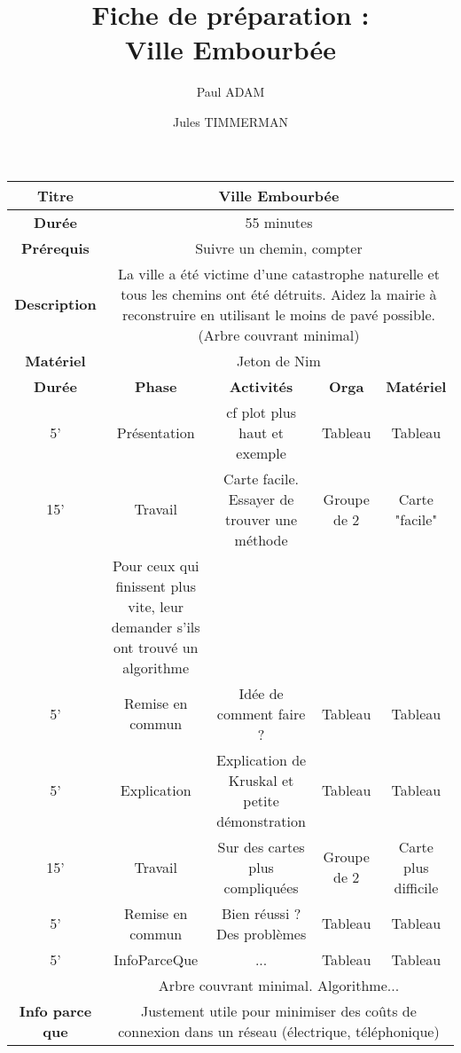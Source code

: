 \documentclass[12pt,landscape]{article}
\author{Paul ADAM \and Jules TIMMERMAN}
\title{Fiche de préparation :\\Ville Embourbée}
\begin{document}
\begin{tabular}{|c|c|c|c|c|}
	\hline
	\textbf{Titre} & \multicolumn{4}{|c|}{Ville Embourbée}\\
	\hline
	\textbf{Durée} & \multicolumn{4}{|c|}{55 minutes}\\
	\hline
	\textbf{Prérequis} & \multicolumn{4}{|c|}{
		Suivre un chemin, compter
	}\\
	\hline
	\textbf{Description} & \multicolumn{4}{|c|}{
		La ville a été victime d'une catastrophe naturelle et tous les chemins ont été détruits. Aidez la mairie à reconstruire en utilisant le moins de pavé possible. (Arbre couvrant minimal)
	}\\
	\hline
	\textbf{Matériel} & \multicolumn{4}{|c|}{
		Jeton de Nim
	}\\
	\hline
	\textbf{Durée} & \textbf{Phase} & \textbf{Activités} & \textbf{Orga} & \textbf{Matériel}\\
	\hline

	5' & Présentation & cf plot plus haut et exemple & Tableau & Tableau\\

	\hline

	15' & Travail & Carte facile. Essayer de trouver une méthode & Groupe de 2 & Carte "facile"\\
	& Pour ceux qui finissent plus vite, leur demander s'ils ont trouvé un algorithme & & &\\

	\hline
	
	5' & Remise en commun & Idée de comment faire ? & Tableau & Tableau\\

	\hline

	5' & Explication & Explication de Kruskal et petite démonstration & Tableau & Tableau\\

	\hline

	15' & Travail & Sur des cartes plus compliquées & Groupe de 2 & Carte plus difficile\\

	\hline

	5' & Remise en commun & Bien réussi ? Des problèmes & Tableau & Tableau\\

	\hline

	5' & InfoParceQue & ... & Tableau & Tableau\\

	\hline


	& \multicolumn{4}{|c|}{
		Arbre couvrant minimal. Algorithme...
	}\\
	\textbf{Info parce que} & \multicolumn{4}{|c|}{
		Justement utile pour minimiser des coûts de connexion dans un réseau (électrique, téléphonique)
	}\\

	
	\hline
\end{tabular}
\end{document}

